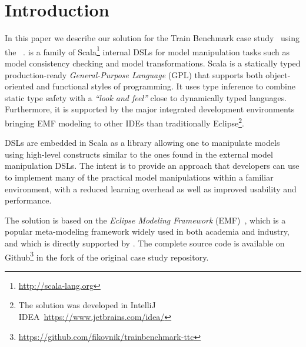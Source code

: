 

\section{Introduction}
\label{sec:Introduction}

In this paper we describe our solution for the \TTC Train Benchmark case study~\cite{Szarnyas2015} using the \SIGMA~\cite{Krikava2014}.
%
\SIGMA is a family of Scala\footnote{\url{http://scala-lang.org}} internal DSLs for model manipulation tasks such as model consistency checking and model transformations.
Scala is a statically typed production-ready \emph{General-Purpose Language} (GPL) that supports both object-oriented and functional styles of programming.
It uses type inference to combine static type safety with a \emph{``look and feel''} close to dynamically typed languages.
Furthermore, it is supported by the major integrated development environments bringing EMF modeling to other IDEs than traditionally Eclipse\footnote{The solution was developed in IntelliJ IDEA~\Cf \url{https://www.jetbrains.com/idea/}}.

\SIGMA DSLs are embedded in Scala as a library allowing one to manipulate models using high-level constructs similar to the ones found in the external model manipulation DSLs.
The intent is to provide an approach that developers can use to implement many of the practical model manipulations within a familiar environment, with a reduced learning overhead as well as improved usability and performance.

The solution is based on the \emph{Eclipse Modeling Framework} (EMF)~\cite{EMF}, which is a popular meta-modeling framework widely used in both academia and industry, and which is directly supported by \SIGMA.
The complete source code is available on Github\footnote{\url{https://github.com/fikovnik/trainbenchmark-ttc}} in the fork of the original case study repository.

